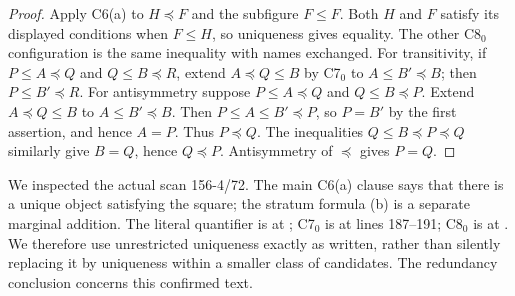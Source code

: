 \begin{proof}
Apply C6(a) to \(H\preceq F\) and the subfigure \(F\leq F\).
Both \(H\) and \(F\) satisfy its displayed conditions when
\(F\leq H\), so uniqueness gives equality. The other C8\(_0\)
configuration is the same inequality with names exchanged.
For transitivity, if \(P\leq A\preceq Q\) and
\(Q\leq B\preceq R\), extend \(A\preceq Q\leq B\)
by C7\(_0\) to \(A\leq B'\preceq B\); then
\(P\leq B'\preceq R\). For antisymmetry suppose
\(P\leq A\preceq Q\) and \(Q\leq B\preceq P\).
Extend \(A\preceq Q\leq B\) to \(A\leq B'\preceq B\).
Then \(P\leq A\leq B'\preceq P\), so \(P=B'\) by the first
assertion, and hence \(A=P\). Thus \(P\preceq Q\).
The inequalities \(Q\leq B\preceq P\preceq Q\) similarly give
\(B=Q\), hence \(Q\preceq P\). Antisymmetry of \(\preceq\)
gives \(P=Q\).
\end{proof}

We inspected the actual scan 156-4/72. The main C6(a) clause says
that there is a unique object satisfying the square; the stratum
formula (b) is a separate marginal addition. The literal quantifier is at
; C7\(_0\) is at
lines 187--191; C8\(_0\) is at
.
We therefore use unrestricted uniqueness exactly as written, rather
than silently replacing it by uniqueness within a smaller class of
candidates. The redundancy conclusion concerns this confirmed text.

